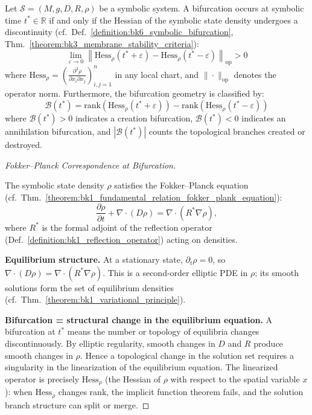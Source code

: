 \begin{theorem}
\label{theorem:bk6_symbolic_bifurcation_classification}
Let $\mathcal{S} = (M, g, D, R, \rho)$ be a symbolic system. A bifurcation occurs at symbolic time $t^* \in \mathbb{R}$ if and only if the Hessian of the symbolic state density undergoes a discontinuity (cf.~Def.~\ref{definition:bk6_symbolic_bifurcation}, Thm.~\ref{theorem:bk3_membrane_stability_criteria}):
\begin{equation}
\lim_{\varepsilon \to 0} \left\| \text{Hess}_\rho(t^* + \varepsilon) - \text{Hess}_\rho(t^* - \varepsilon) \right\|_{\text{op}} > 0
\end{equation}
where $\text{Hess}_\rho = \left(\frac{\partial^2 \rho}{\partial x_i \partial x_j}\right)_{i,j=1}^n$ in any local chart, and $\|\cdot\|_{\text{op}}$ denotes the operator norm.
Furthermore, the bifurcation geometry is classified by:
\begin{equation}
\mathcal{B}(t^*) = \text{rank}(\text{Hess}_\rho(t^* + \varepsilon)) - \text{rank}(\text{Hess}_\rho(t^* - \varepsilon))
\end{equation}
where $\mathcal{B}(t^*) > 0$ indicates a creation bifurcation, $\mathcal{B}(t^*) < 0$ indicates an annihilation bifurcation, and $|\mathcal{B}(t^*)|$ counts the topological branches created or destroyed.
\begin{proof}[Fokker--Planck Correspondence at Bifurcation]
\label{proof:bk6_symbolic_fokker_planck_bifurcation}
\leavevmode

The symbolic state density $\rho$ satisfies the Fokker--Planck equation
(cf.~Thm.~\ref{theorem:bk1_fundamental_relation_fokker_plank_equation}):
\begin{equation}
\frac{\partial \rho}{\partial t} + \nabla \cdot (D \rho) = \nabla \cdot (R^* \nabla \rho),
\end{equation}
where $R^*$ is the formal adjoint of the reflection operator
(Def.~\ref{definition:bk1_reflection_operator}) acting on densities.

\textbf{Equilibrium structure.}
At a stationary state, $\partial_t\rho = 0$, so
$\nabla\cdot(D\rho) = \nabla\cdot(R^*\nabla\rho)$.
This is a second-order elliptic PDE in $\rho$; its smooth solutions form the set of
equilibrium densities (cf.~Thm.~\ref{theorem:bk1_variational_principle}).

\textbf{Bifurcation = structural change in the equilibrium equation.}
A bifurcation at $t^*$ means the number or topology of equilibria changes discontinuously.
By elliptic regularity, smooth changes in $D$ and $R$ produce smooth changes in $\rho$.
Hence a topological change in the solution set requires a singularity in the linearization
of the equilibrium equation. The linearized operator is precisely $\text{Hess}_\rho$
(the Hessian of $\rho$ with respect to the spatial variable $x$): when
$\text{Hess}_\rho$ changes rank, the implicit function theorem fails, and the solution
branch structure can split or merge.


\end{proof}
\end{theorem}
